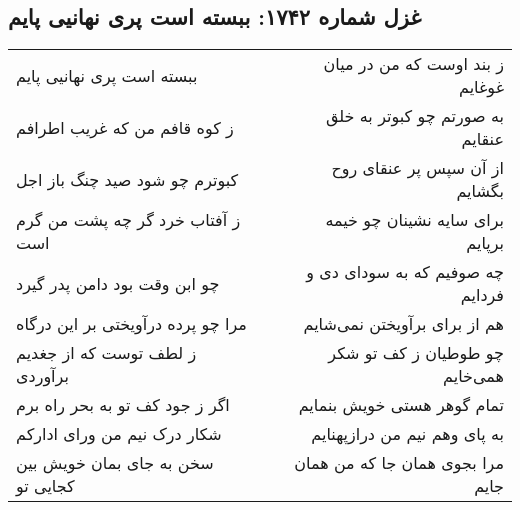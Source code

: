 \begin{center}
\section*{غزل شماره ۱۷۴۲: ببسته است پری نهانیی پایم}
\label{sec:1742}
\begin{longtable}{l p{0.5cm} r}
ببسته است پری نهانیی پایم
&&
ز بند اوست که من در میان غوغایم
\\
ز کوه قافم من که غریب اطرافم
&&
به صورتم چو کبوتر به خلق عنقایم
\\
کبوترم چو شود صید چنگ باز اجل
&&
از آن سپس پر عنقای روح بگشایم
\\
ز آفتاب خرد گر چه پشت من گرم است
&&
برای سایه نشینان چو خیمه برپایم
\\
چو ابن وقت بود دامن پدر گیرد
&&
چه صوفیم که به سودای دی و فردایم
\\
مرا چو پرده درآویختی بر این درگاه
&&
هم از برای برآویختن نمی‌شایم
\\
ز لطف توست که از جغدیم برآوردی
&&
چو طوطیان ز کف تو شکر همی‌خایم
\\
اگر ز جود کف تو به بحر راه برم
&&
تمام گوهر هستی خویش بنمایم
\\
شکار درک نیم من ورای ادارکم
&&
به پای وهم نیم من درازپهنایم
\\
سخن به جای بمان خویش بین کجایی تو
&&
مرا بجوی همان جا که من همان جایم
\\
\end{longtable}
\end{center}
